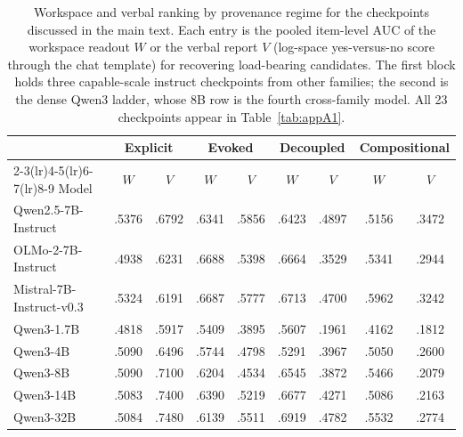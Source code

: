 \begin{table}[tbp]
\centering
\caption{Workspace and verbal ranking by provenance regime for the checkpoints discussed in the main text. Each entry is the pooled item-level AUC of the workspace readout $W$ or the verbal report $V$ (log-space yes-versus-no score through the chat template) for recovering load-bearing candidates. The first block holds three capable-scale instruct checkpoints from other families; the second is the dense Qwen3 ladder, whose 8B row is the fourth cross-family model. All 23 checkpoints appear in Table~\ref{tab:appA1}.}
\label{tab:master}
\footnotesize
\setlength{\tabcolsep}{3.8pt}
\begin{tabular}{l*{8}{c}}
\toprule
 & \multicolumn{2}{c}{Explicit} & \multicolumn{2}{c}{Evoked} & \multicolumn{2}{c}{Decoupled} & \multicolumn{2}{c}{Compositional} \\
\cmidrule(lr){2-3}\cmidrule(lr){4-5}\cmidrule(lr){6-7}\cmidrule(lr){8-9}
Model & $W$ & $V$ & $W$ & $V$ & $W$ & $V$ & $W$ & $V$ \\
\midrule
Qwen2.5-7B-Instruct & .5376 & .6792 & .6341 & .5856 & .6423 & .4897 & .5156 & .3472 \\
OLMo-2-7B-Instruct & .4938 & .6231 & .6688 & .5398 & .6664 & .3529 & .5341 & .2944 \\
Mistral-7B-Instruct-v0.3 & .5324 & .6191 & .6687 & .5777 & .6713 & .4700 & .5962 & .3242 \\
\midrule
Qwen3-1.7B & .4818 & .5917 & .5409 & .3895 & .5607 & .1961 & .4162 & .1812 \\
Qwen3-4B & .5090 & .6496 & .5744 & .4798 & .5291 & .3967 & .5050 & .2600 \\
Qwen3-8B & .5090 & .7100 & .6204 & .4534 & .6545 & .3872 & .5466 & .2079 \\
Qwen3-14B & .5083 & .7400 & .6390 & .5219 & .6677 & .4271 & .5086 & .2163 \\
Qwen3-32B & .5084 & .7480 & .6139 & .5511 & .6919 & .4782 & .5532 & .2774 \\
\bottomrule
\end{tabular}
\end{table}
